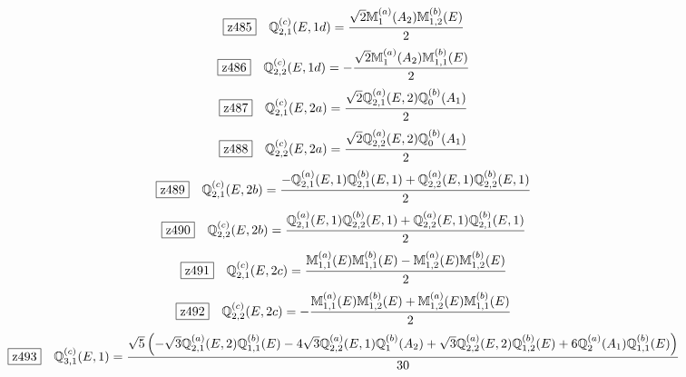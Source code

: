 \documentclass[fleqn,10pt,landscape]{jsarticle}
\begin{document}
\begin{dmath*}
\hspace*{3mm}\fbox{z485}\quad \mathbb{Q}_{2,1}^{(c)}(E,1d)=\frac{\sqrt{2} \mathbb{M}_{1}^{(a)}(A_{2}) \mathbb{M}_{1,2}^{(b)}(E)}{2}
\end{dmath*}
\begin{dmath*}
\hspace*{3mm}\fbox{z486}\quad \mathbb{Q}_{2,2}^{(c)}(E,1d)=- \frac{\sqrt{2} \mathbb{M}_{1}^{(a)}(A_{2}) \mathbb{M}_{1,1}^{(b)}(E)}{2}
\end{dmath*}
\begin{dmath*}
\hspace*{3mm}\fbox{z487}\quad \mathbb{Q}_{2,1}^{(c)}(E,2a)=\frac{\sqrt{2} \mathbb{Q}_{2,1}^{(a)}(E,2) \mathbb{Q}_{0}^{(b)}(A_{1})}{2}
\end{dmath*}
\begin{dmath*}
\hspace*{3mm}\fbox{z488}\quad \mathbb{Q}_{2,2}^{(c)}(E,2a)=\frac{\sqrt{2} \mathbb{Q}_{2,2}^{(a)}(E,2) \mathbb{Q}_{0}^{(b)}(A_{1})}{2}
\end{dmath*}
\begin{dmath*}
\hspace*{3mm}\fbox{z489}\quad \mathbb{Q}_{2,1}^{(c)}(E,2b)=\frac{- \mathbb{Q}_{2,1}^{(a)}(E,1) \mathbb{Q}_{2,1}^{(b)}(E,1) + \mathbb{Q}_{2,2}^{(a)}(E,1) \mathbb{Q}_{2,2}^{(b)}(E,1)}{2}
\end{dmath*}
\begin{dmath*}
\hspace*{3mm}\fbox{z490}\quad \mathbb{Q}_{2,2}^{(c)}(E,2b)=\frac{\mathbb{Q}_{2,1}^{(a)}(E,1) \mathbb{Q}_{2,2}^{(b)}(E,1) + \mathbb{Q}_{2,2}^{(a)}(E,1) \mathbb{Q}_{2,1}^{(b)}(E,1)}{2}
\end{dmath*}
\begin{dmath*}
\hspace*{3mm}\fbox{z491}\quad \mathbb{Q}_{2,1}^{(c)}(E,2c)=\frac{\mathbb{M}_{1,1}^{(a)}(E) \mathbb{M}_{1,1}^{(b)}(E) - \mathbb{M}_{1,2}^{(a)}(E) \mathbb{M}_{1,2}^{(b)}(E)}{2}
\end{dmath*}
\begin{dmath*}
\hspace*{3mm}\fbox{z492}\quad \mathbb{Q}_{2,2}^{(c)}(E,2c)=- \frac{\mathbb{M}_{1,1}^{(a)}(E) \mathbb{M}_{1,2}^{(b)}(E) + \mathbb{M}_{1,2}^{(a)}(E) \mathbb{M}_{1,1}^{(b)}(E)}{2}
\end{dmath*}
\begin{dmath*}
\hspace*{3mm}\fbox{z493}\quad \mathbb{Q}_{3,1}^{(c)}(E,1)=\frac{\sqrt{5} \left(- \sqrt{3} \mathbb{Q}_{2,1}^{(a)}(E,2) \mathbb{Q}_{1,1}^{(b)}(E) - 4 \sqrt{3} \mathbb{Q}_{2,2}^{(a)}(E,1) \mathbb{Q}_{1}^{(b)}(A_{2}) + \sqrt{3} \mathbb{Q}_{2,2}^{(a)}(E,2) \mathbb{Q}_{1,2}^{(b)}(E) + 6 \mathbb{Q}_{2}^{(a)}(A_{1}) \mathbb{Q}_{1,1}^{(b)}(E)\right)}{30}
\end{dmath*}
\end{document}
